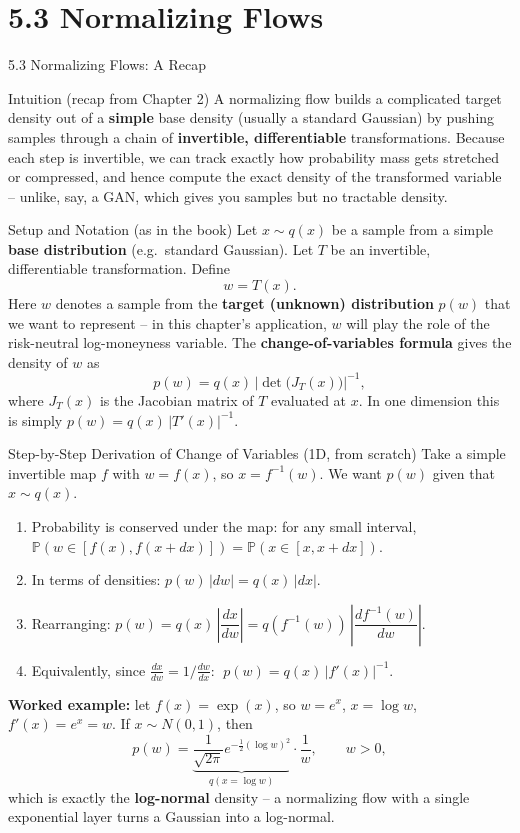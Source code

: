 \documentclass[aspectratio=169,10pt]{beamer}
\newcommand{\Prob}{\mathbb{P}}
\begin{document}
\section{5.3 Normalizing Flows}
\begin{frame}[allowframebreaks]{5.3 Normalizing Flows: A Recap}

\begin{block}{Intuition (recap from Chapter 2)}
A normalizing flow builds a complicated target density out of a
\textbf{simple} base density (usually a standard Gaussian) by pushing
samples through a chain of \textbf{invertible, differentiable}
transformations. Because each step is invertible, we can track exactly how
probability mass gets stretched or compressed, and hence compute the exact
density of the transformed variable -- unlike, say, a GAN, which gives you
samples but no tractable density.
\end{block}

\begin{block}{Setup and Notation (as in the book)}
Let $x \sim q(x)$ be a sample from a simple \textbf{base distribution}
(e.g.\ standard Gaussian). Let $T$ be an invertible, differentiable
transformation. Define
\[
w = T(x).
\]
Here $w$ denotes a sample from the \textbf{target (unknown) distribution}
$p(w)$ that we want to represent -- in this chapter's application, $w$ will
play the role of the risk-neutral log-moneyness variable. The
\textbf{change-of-variables formula} gives the density of $w$ as
\[
p(w) = q(x)\,\big|\det\big(J_T(x)\big)\big|^{-1}, \tag{5.9}
\]
where $J_T(x)$ is the Jacobian matrix of $T$ evaluated at $x$. In one
dimension this is simply $p(w) = q(x)\,|T'(x)|^{-1}$.
\end{block}

\framebreak

\begin{block}{Step-by-Step Derivation of Change of Variables (1D, from scratch)}
Take a simple invertible map $f$ with $w = f(x)$, so $x = f^{-1}(w)$. We
want $p(w)$ given that $x\sim q(x)$.
\begin{enumerate}
  \item Probability is conserved under the map: for any small interval,
  $\Prob(w \in [f(x), f(x+dx)]) = \Prob(x\in[x,x+dx])$.
  \item In terms of densities: $p(w)\,|dw| = q(x)\,|dx|$.
  \item Rearranging: $p(w) = q(x)\,\left|\dfrac{dx}{dw}\right| = q(f^{-1}(w))\,\left|\dfrac{d f^{-1}(w)}{dw}\right|$.
  \item Equivalently, since $\frac{dx}{dw} = 1/\frac{dw}{dx}$: $\;p(w) = q(x)\,|f'(x)|^{-1}$.
\end{enumerate}
\textbf{Worked example:} let $f(x) = \exp(x)$, so $w = e^x$, $x=\log w$,
$f'(x) = e^x = w$. If $x\sim N(0,1)$, then
\[
p(w) = \underbrace{\frac{1}{\sqrt{2\pi}}e^{-\frac{1}{2}(\log w)^2}}_{q(x=\log w)}
        \cdot \frac{1}{w}, \qquad w>0,
\]
which is exactly the \textbf{log-normal} density -- a normalizing flow with
a single exponential layer turns a Gaussian into a log-normal.
\end{block}


\end{frame}
\end{document}

